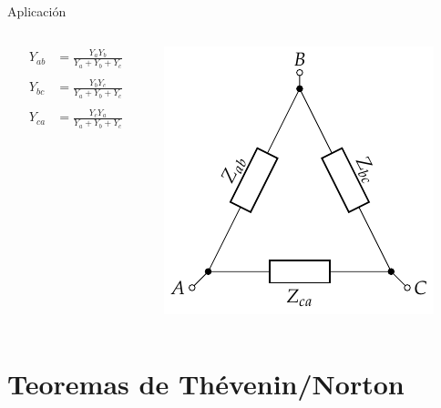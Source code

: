 \documentclass[aspectratio=169, usenames,svgnames,dvipsnames]{beamer}
\begin{document}
\begin{frame}[label={sec:orge606433}]{Aplicación}
\begin{columns}
\begin{column}{0.3\columnwidth}
\begin{align*}
  Y_{ab} &= \frac{Y_a Y_b}{Y_a + Y_b + Y_c}\\
  \\
  Y_{bc} &= \frac{Y_b Y_c}{Y_a + Y_b + Y_c}\\
  \\
  Y_{ca} &= \frac{Y_c Y_a}{Y_a + Y_b + Y_c}\\
\end{align*}
\end{column}
\begin{column}{0.3\columnwidth}
\begin{center}
\includegraphics[height=0.5\textheight]{../figs/Impedancia_Triangulo.pdf}
\end{center}
\end{column}
\end{columns}
\end{frame}

\section{Teoremas de Thévenin/Norton}
\label{sec:orgff140ea}
\end{document}
